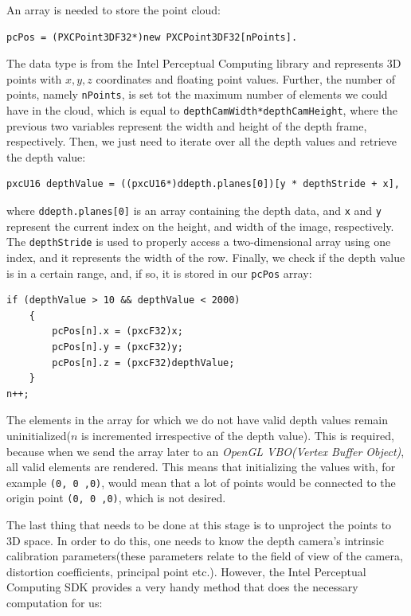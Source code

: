 \documentclass[]{article}
\begin{document}
An array is needed to store the point cloud:


\begin{verbatim}pcPos = (PXCPoint3DF32*)new PXCPoint3DF32[nPoints].\end{verbatim} 


The data type is from the Intel Perceptual Computing library and represents 3D points with $x,y,z$ coordinates and floating point values. Further, the number of points, namely \verb|nPoints|, is set tot the maximum number of elements we could have in the cloud, which is equal to \verb|depthCamWidth*depthCamHeight|, where the previous two variables represent the width and height of the depth frame, respectively. Then, we just need to iterate over all the depth values and retrieve the depth value:

 \begin{verbatim}pxcU16 depthValue = ((pxcU16*)ddepth.planes[0])[y * depthStride + x],\end{verbatim} 
 
 
where \verb|ddepth.planes[0]| is an array containing the depth data, and  \verb|x| and \verb|y| represent the current index on the height, and width of the image, respectively. The \verb|depthStride| is used to properly access a two-dimensional array using one index, and it represents the width of the row. Finally, we check if the depth value is in a certain range, and, if so, it is stored in our \verb|pcPos| array:
\begin{verbatim}
if (depthValue > 10 && depthValue < 2000)
	{
		pcPos[n].x = (pxcF32)x;
		pcPos[n].y = (pxcF32)y;
		pcPos[n].z = (pxcF32)depthValue;	
	}
n++;
\end{verbatim}
The elements in the array for which we do not have valid depth values remain uninitialized($n$ is incremented irrespective of the depth value). This is required, because when we send the array later to an \textit{OpenGL VBO(Vertex Buffer Object)}, all valid elements are rendered. This means that initializing the values with, for example \verb|(0, 0 ,0)|, would mean that a lot of points would be connected to the origin point \verb|(0, 0 ,0)|, which is not desired.

The last thing that needs to be done at this stage is to unproject the points to 3D space. In order to do this, one needs to know the depth camera's intrinsic calibration parameters(these parameters relate to the field of view of the camera, distortion coefficients, principal point etc.). However, the Intel Perceptual Computing SDK provides a very handy method that does the necessary computation for us:
\end{document}
